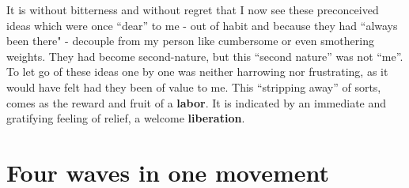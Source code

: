 It is without bitterness and without regret that I now 
see these preconceived ideas which were once ``dear'' to me - 
out of habit and because they
had ``always been there" - 
decouple from my person like cumbersome or even smothering weights. 
They had become second-nature, but this ``second nature'' was not ``me''.
To let go of these ideas one by one was neither harrowing nor frustrating, as it would
have felt had they been of value to me.
This ``stripping away'' of sorts, comes as the reward and fruit of a 
\textbf{labor}. 
It is indicated by an immediate and gratifying feeling of relief, a welcome 
\textbf{liberation}.

\section{Four waves in one movement}




% 
